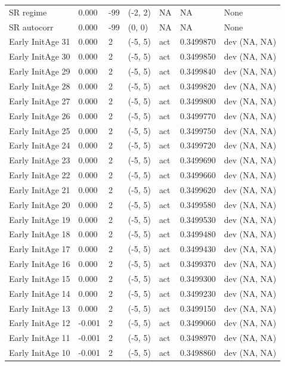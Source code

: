 \documentclass[11pt,
  english,
  a4paper,
]{article}
\begin{document}
\begin{landscape}
\begin{longtable}[t]{>{\raggedright\arraybackslash}p{7cm}lllll>{\raggedright\arraybackslash}p{4cm}}
SR regime & 0.000 & -99 & (-2, 2) & NA & NA & None\\
SR autocorr & 0.000 & -99 & (0, 0) & NA & NA & None\\
Early InitAge 31 & 0.000 & 2 & (-5, 5) & act & 0.3499870 & dev (NA, NA)\\
Early InitAge 30 & 0.000 & 2 & (-5, 5) & act & 0.3499850 & dev (NA, NA)\\
Early InitAge 29 & 0.000 & 2 & (-5, 5) & act & 0.3499840 & dev (NA, NA)\\
Early InitAge 28 & 0.000 & 2 & (-5, 5) & act & 0.3499820 & dev (NA, NA)\\
Early InitAge 27 & 0.000 & 2 & (-5, 5) & act & 0.3499800 & dev (NA, NA)\\
Early InitAge 26 & 0.000 & 2 & (-5, 5) & act & 0.3499770 & dev (NA, NA)\\
Early InitAge 25 & 0.000 & 2 & (-5, 5) & act & 0.3499750 & dev (NA, NA)\\
Early InitAge 24 & 0.000 & 2 & (-5, 5) & act & 0.3499720 & dev (NA, NA)\\
Early InitAge 23 & 0.000 & 2 & (-5, 5) & act & 0.3499690 & dev (NA, NA)\\
Early InitAge 22 & 0.000 & 2 & (-5, 5) & act & 0.3499660 & dev (NA, NA)\\
Early InitAge 21 & 0.000 & 2 & (-5, 5) & act & 0.3499620 & dev (NA, NA)\\
Early InitAge 20 & 0.000 & 2 & (-5, 5) & act & 0.3499580 & dev (NA, NA)\\
Early InitAge 19 & 0.000 & 2 & (-5, 5) & act & 0.3499530 & dev (NA, NA)\\
Early InitAge 18 & 0.000 & 2 & (-5, 5) & act & 0.3499480 & dev (NA, NA)\\
Early InitAge 17 & 0.000 & 2 & (-5, 5) & act & 0.3499430 & dev (NA, NA)\\
Early InitAge 16 & 0.000 & 2 & (-5, 5) & act & 0.3499370 & dev (NA, NA)\\
Early InitAge 15 & 0.000 & 2 & (-5, 5) & act & 0.3499300 & dev (NA, NA)\\
Early InitAge 14 & 0.000 & 2 & (-5, 5) & act & 0.3499230 & dev (NA, NA)\\
Early InitAge 13 & 0.000 & 2 & (-5, 5) & act & 0.3499150 & dev (NA, NA)\\
Early InitAge 12 & -0.001 & 2 & (-5, 5) & act & 0.3499060 & dev (NA, NA)\\
Early InitAge 11 & -0.001 & 2 & (-5, 5) & act & 0.3498970 & dev (NA, NA)\\
Early InitAge 10 & -0.001 & 2 & (-5, 5) & act & 0.3498860 & dev (NA, NA)\\

\end{longtable}
\end{landscape}
\end{document}
